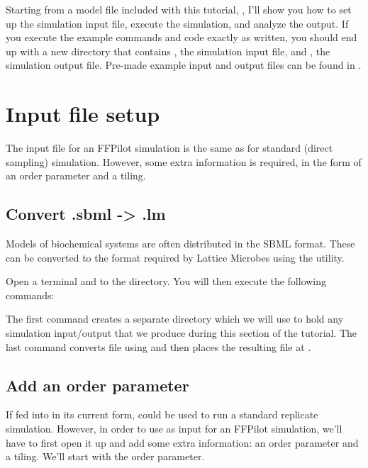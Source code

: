 {Starting from a  model file included with this tutorial, \pth{\sbmlpath}, I'll show you how to set up the simulation input file, execute the simulation, and analyze the output. If you execute the example commands and code exactly as written, you should end up with a new directory \pth{\datapath} that contains \pth{\lm}, the simulation input file, and \pth{\out}, the simulation output file. Pre-made example input and output files can be found in \pth{\datawpath}.

\section{Input file setup}\label{sec:srg_mfpt_input_setup}
The input file for an FFPilot simulation is the same as for standard (\ie direct sampling) simulation. However, some extra information is required, in the form of an order parameter and a tiling. %

\subsection{Convert .sbml -> .lm}\label{sec:sbml_conversion_srg}
Models of biochemical systems are often distributed in the SBML format. These can be converted to the  format required by Lattice Microbes using the  utility.

Open a terminal and  to the \pth{\dir} directory. You will then execute the following commands:


The first command creates a separate \pth{\datapath} directory which we will use to hold any simulation input/output that we produce during this section of the tutorial. The last command converts \pth{\sbmlpath} file using   and then places the resulting  file at \pth{\lmpath}.

\subsection{Add an order parameter}\label{sec:add_op}
If fed into  in its current form, \pth{\lm} could be used to run a standard replicate simulation. However, in order to use \pth{\lm} as input for an FFPilot simulation, we'll have to first open it up and add some extra information: an order parameter and a tiling. We'll start with the order parameter.

}
